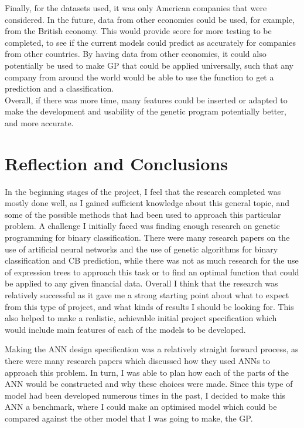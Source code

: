 \documentclass[11pt]{article}
\begin{document}
Finally, for the datasets used, it was only American companies that were considered. In the future, data from other economies could be used, for example, from the British economy. This would provide score for more testing to be completed, to see if the current models could predict as accurately for companies from other countries. By having data from other economies, it could also potentially be used to make GP that could be applied universally, such that any company from around the world would be able to use the function to get a prediction and a classification. \\

Overall, if there was more time, many features could be inserted or adapted to make the development and usability of the genetic program potentially better, and more accurate.

\section{Reflection and Conclusions}\label{sec:Refl}
In the beginning stages of the project, I feel that the research completed was mostly done well, as I gained sufficient knowledge about this general topic, and some of the possible methods that had been used to approach this particular problem. A challenge I initially faced was finding enough research on genetic programming for binary classification. There were many research papers on the use of artificial neural networks and the use of genetic algorithms for binary classification and CB prediction, while there was not as much research for the use of expression trees to approach this task or to find an optimal function that could be applied to any given financial data. Overall I think that the research was relatively successful as it gave me a strong starting point about what to expect from this type of project, and what kinds of results I should be looking for. This also helped to make a realistic, achievable initial project specification which would include main features of each of the models to be developed.

Making the ANN design specification was a relatively straight forward process, as there were many research papers which discussed how they used ANNs to approach this problem. In turn, I was able to plan how each of the parts of the ANN would be constructed and why these choices were made. Since this type of model had been developed numerous times in the past, I decided to make this ANN a benchmark, where I could make an optimised model which could be compared against the other model that I was going to make, the GP. 
\end{document}
